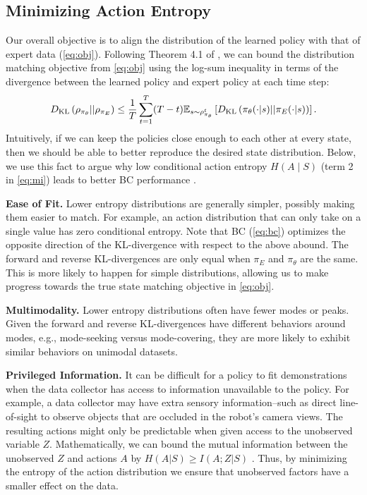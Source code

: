 \subsection{Minimizing Action Entropy}
Our overall objective is to align the distribution of the learned policy with that of expert data (\cref{eq:obj}). Following Theorem 4.1 of \citet{belkhale2024data}, we can bound the distribution matching objective from \cref{eq:obj} using the log-sum inequality in terms of the divergence between the learned policy and expert policy at each time step:
\begin{equation*}
    D_\text{KL}\left(\rho_{\pi_\theta} || \rho_{\pi_E} \right) \leq \frac{1}{T} \sum_{t=1}^T (T - t) \mathbb{E}_{s \sim \rho^t_{\pi_\theta}}\left[D_\text{KL}\left( \pi_\theta(\cdot | s) || \pi_E( \cdot | s)\right)\right].
\end{equation*}
Intuitively, if we can keep the policies close enough to each other at every state, then we should be able to better reproduce the desired state distribution. Below, we use this fact to argue why low conditional action entropy $H(A \mid S)$ (term 2 in \cref{eq:mi}) leads to better BC performance \citep{belkhale2024data}. 

 
\smallskip \noindent \textbf{Ease of Fit.} Lower entropy distributions are generally simpler, possibly making them easier to match. For example, an action distribution that can only take on a single value has zero conditional entropy. Note that BC (\cref{eq:bc}) optimizes the opposite direction of the KL-divergence with respect to the above abound. The forward and reverse KL-divergences are only equal when $\pi_E$ and $\pi_\theta$ are the same. This is more likely to happen for simple distributions, allowing us to make progress towards the true state matching objective in \cref{eq:obj}. 

\smallskip \noindent \textbf{Multimodality.} Lower entropy distributions often have fewer modes or peaks. Given the forward and reverse KL-divergences have different behaviors around modes, e.g., mode-seeking versus mode-covering, they are more likely to exhibit similar behaviors on unimodal datasets.  

\smallskip \noindent \textbf{Privileged Information.} It can be difficult for a policy to fit demonstrations when the data collector has access to information unavailable to the policy. For example, a data collector may have extra sensory information--such as direct line-of-sight to observe objects that are occluded in the robot's camera views. The resulting actions might only be predictable when given access to the unobserved variable $Z$. Mathematically, we can bound the mutual information between the unobserved $Z$ and actions $A$ by $H(A|S) \geq I(A;Z|S)$ \citep{cover1999elements}. Thus, by minimizing the entropy of the action distribution we ensure that unobserved factors have a smaller effect on the data.

